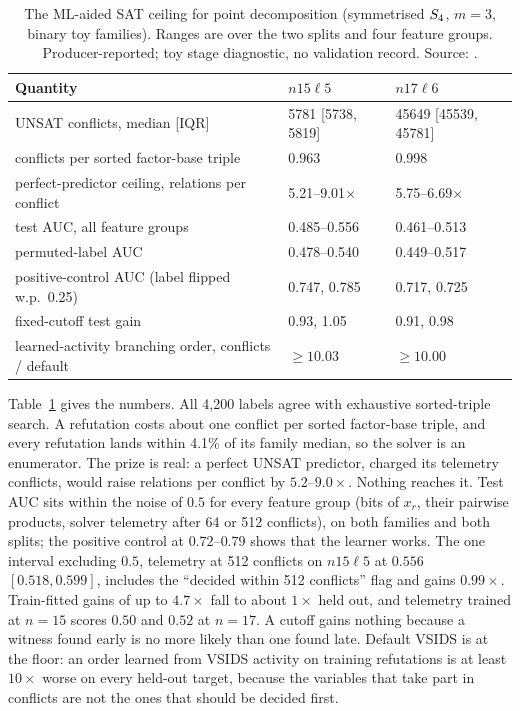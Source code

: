 \begin{table}[t]
\centering\small
\begin{tabularx}{\linewidth}{@{}Xll@{}}
\toprule
Quantity & $n15\ell5$ & $n17\ell6$ \\
\midrule
UNSAT conflicts, median [IQR] & 5781 [5738, 5819] & 45649 [45539, 45781] \\
conflicts per sorted factor-base triple & 0.963 & 0.998 \\
perfect-predictor ceiling, relations per conflict & 5.21--9.01$\times$ & 5.75--6.69$\times$ \\
test AUC, all feature groups & 0.485--0.556 & 0.461--0.513 \\
permuted-label AUC & 0.478--0.540 & 0.449--0.517 \\
positive-control AUC (label flipped w.p.\ 0.25) & 0.747, 0.785 & 0.717, 0.725 \\
fixed-cutoff test gain & 0.93, 1.05 & 0.91, 0.98 \\
learned-activity branching order, conflicts / default & $\ge10.03$ & $\ge10.00$ \\
\bottomrule
\end{tabularx}
\caption[]{The ML-aided SAT ceiling for point decomposition (symmetrised
$S_{4}$, $m=3$, binary toy families). Ranges are over the two splits and
four feature groups. Producer-reported; toy stage diagnostic, no
validation record. Source:
.}
\label{tab:ln-ceiling}
\end{table}

Table~\ref{tab:ln-ceiling} gives the numbers. All 4{,}200 labels agree with
exhaustive sorted-triple search. A refutation costs about one conflict per
sorted factor-base triple, and every refutation lands within 4.1\% of its
family median, so the solver is an enumerator. The prize is real: a perfect
UNSAT predictor, charged its telemetry conflicts, would raise relations per
conflict by $5.2$--$9.0\times$. Nothing reaches it. Test AUC sits within the
noise of $0.5$ for every feature group (bits of $x_r$, their pairwise
products, solver telemetry after 64 or 512 conflicts), on both families and
both splits; the positive control at $0.72$--$0.79$ shows that the learner
works. The one interval excluding $0.5$, telemetry at 512 conflicts on
$n15\ell5$ at $0.556$ $[0.518,0.599]$, includes the ``decided within 512
conflicts'' flag and gains $0.99\times$. Train-fitted gains of up to $4.7\times$
fall to about $1\times$ held out, and telemetry trained at $n=15$ scores $0.50$ and
$0.52$ at $n=17$. A cutoff gains nothing because a witness found early is no
more likely than one found late. Default VSIDS is at the floor: an order
learned from VSIDS activity on training refutations is at least $10\times$
worse on every held-out target, because the variables that take part in
conflicts are not the ones that should be decided first.

